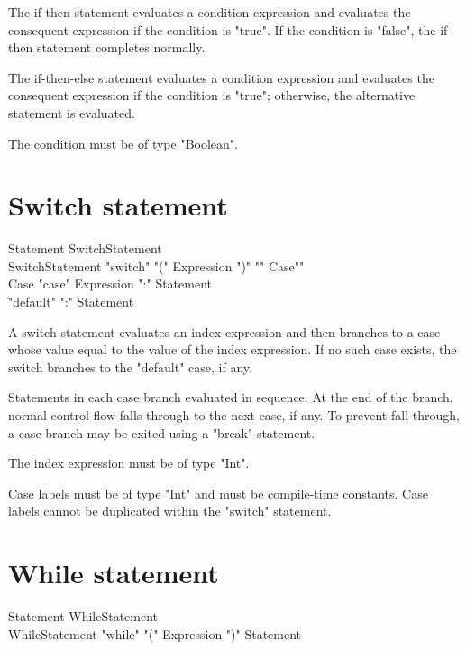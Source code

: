The if-then statement evaluates a condition expression and 
evaluates the consequent expression if the condition is
\xcd"true".  If the 
condition is \xcd"false",
the if-then statement completes normally.

The if-then-else statement evaluates a condition expression and 
evaluates the consequent expression if the condition is
\xcd"true"; otherwise, the alternative statement is evaluated.

The condition must be of type \xcd"Boolean".

\section{Switch statement}

\begin{grammar}
Statement \: SwitchStatement \\
SwitchStatement \: \xcd"switch" \xcd"(" Expression \xcd")" \xcd"{" Case\plus \xcd"}" \\
Case \: \xcd"case" Expression \xcd":" Statement\star \\
     \| \xcd"default" \xcd":" Statement\star \\
\end{grammar}

A switch statement evaluates an index expression and then branches to
a case whose value equal to the value of the index expression.
If no such case exists, the switch branches to the 
\xcd"default" case, if any.

Statements in each case branch evaluated in sequence.  At the
end of the branch, normal control-flow falls through to the next case, if
any.  To prevent fall-through, a case branch may be exited using
a \xcd"break" statement.

The index expression must be of type \xcd"Int".

Case labels must be of type \xcd"Int" and must be compile-time
constants.  Case labels cannot be duplicated within the
\xcd"switch" statement.

\section{While statement}

\begin{grammar}
Statement \: WhileStatement \\
WhileStatement \: \xcd"while" \xcd"(" Expression \xcd")" Statement \\
\end{grammar}

